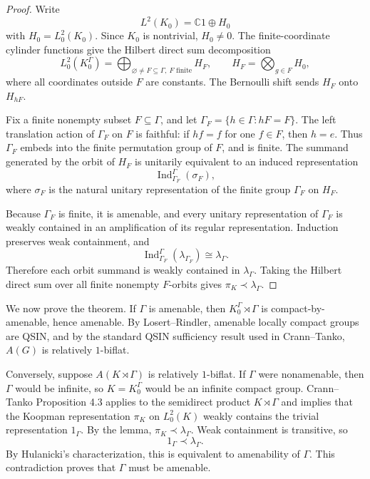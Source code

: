 \documentclass[11pt]{article}
\newcommand{\A}{A}
\newcommand{\C}{\mathbb{C}}
\begin{document}
\begin{proof}
Write
\[
  L^2(K_0)=\C 1\oplus H_0
\]
with \(H_0=L^2_0(K_0)\). Since \(K_0\) is nontrivial, \(H_0\neq 0\).
The finite-coordinate cylinder functions give the Hilbert direct sum
decomposition
\[
  L^2_0(K_0^\Gamma)
  =
  \bigoplus_{\varnothing\neq F\subseteq\Gamma,\ F\text{ finite}}
  H_F,
  \qquad
  H_F=\bigotimes_{g\in F} H_0,
\]
where all coordinates outside \(F\) are constants. The Bernoulli shift
sends \(H_F\) onto \(H_{hF}\).

Fix a finite nonempty subset \(F\subseteq\Gamma\), and let
\(\Gamma_F=\{h\in\Gamma:hF=F\}\). The left translation action of
\(\Gamma_F\) on \(F\) is faithful: if \(hf=f\) for one \(f\in F\), then
\(h=e\). Thus \(\Gamma_F\) embeds into the finite permutation group of
\(F\), and is finite. The summand generated by the orbit of \(H_F\) is
unitarily equivalent to an induced representation
\[
  \operatorname{Ind}_{\Gamma_F}^{\Gamma}(\sigma_F),
\]
where \(\sigma_F\) is the natural unitary representation of the finite
group \(\Gamma_F\) on \(H_F\).

Because \(\Gamma_F\) is finite, it is amenable, and every unitary
representation of \(\Gamma_F\) is weakly contained in an amplification of
its regular representation. Induction preserves weak containment, and
\[
  \operatorname{Ind}_{\Gamma_F}^{\Gamma}(\lambda_{\Gamma_F})
  \cong \lambda_\Gamma.
\]
Therefore each orbit summand is weakly contained in \(\lambda_\Gamma\).
Taking the Hilbert direct sum over all finite nonempty \(F\)-orbits gives
\(\pi_K\prec\lambda_\Gamma\).
\end{proof}

We now prove the theorem. If \(\Gamma\) is amenable, then
\(K_0^\Gamma\rtimes\Gamma\) is compact-by-amenable, hence amenable. By
Losert--Rindler, amenable locally compact groups are QSIN, and by the
standard QSIN sufficiency result used in Crann--Tanko, \(\A(G)\) is
relatively \(1\)-biflat.

Conversely, suppose \(\A(K\rtimes\Gamma)\) is relatively \(1\)-biflat.
If \(\Gamma\) were nonamenable, then \(\Gamma\) would be infinite, so
\(K=K_0^\Gamma\) would be an infinite compact group. Crann--Tanko
Proposition 4.3 applies to the semidirect product \(K\rtimes\Gamma\) and
implies that the Koopman representation \(\pi_K\) on \(L^2_0(K)\) weakly
contains the trivial representation \(1_\Gamma\). By the lemma,
\(\pi_K\prec\lambda_\Gamma\). Weak containment is transitive, so
\[
  1_\Gamma\prec\lambda_\Gamma.
\]
By Hulanicki's characterization, this is equivalent to amenability of
\(\Gamma\). This contradiction proves that \(\Gamma\) must be amenable.
\end{document}
